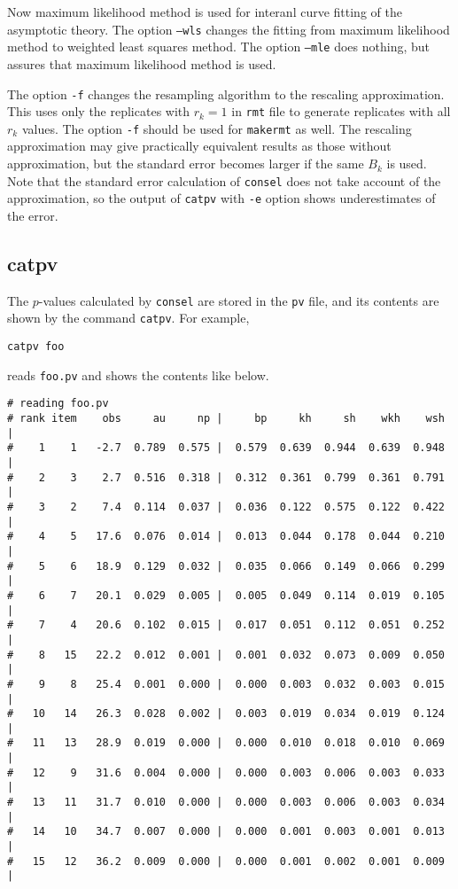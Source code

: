\documentclass[12pt]{article}
\begin{document}
Now maximum likelihood method is used for interanl curve fitting of the
asymptotic theory. The option {\tt --wls} changes the fitting from
maximum likelihood method to weighted least squares method.  The option
{\tt --mle} does nothing, but assures that maximum likelihood method is
used.

The option {\tt -f} changes the resampling algorithm to the rescaling
approximation. This uses only the replicates with $r_k=1$ in {\tt rmt}
file to generate replicates with all $r_k$ values. The option {\tt -f}
should be used for {\tt makermt} as well. The rescaling approximation
may give practically equivalent results as those without approximation,
but the standard error becomes larger if the same $B_k$ is used. Note
that the standard error calculation of {\tt consel} does not take account of
the approximation, so the output of {\tt catpv} with {\tt -e} option
shows underestimates of the error.



\subsection{catpv}

The $p$-values calculated by {\tt consel} are stored in the {\tt pv}
file, and its contents are shown by the command {\tt catpv}. For
example,
\begin{verbatim}
catpv foo
\end{verbatim}
reads {\tt foo.pv} and shows the contents like below.
{\small
\begin{verbatim}
# reading foo.pv
# rank item    obs     au     np |     bp     kh     sh    wkh    wsh |
#    1    1   -2.7  0.789  0.575 |  0.579  0.639  0.944  0.639  0.948 |
#    2    3    2.7  0.516  0.318 |  0.312  0.361  0.799  0.361  0.791 |
#    3    2    7.4  0.114  0.037 |  0.036  0.122  0.575  0.122  0.422 |
#    4    5   17.6  0.076  0.014 |  0.013  0.044  0.178  0.044  0.210 |
#    5    6   18.9  0.129  0.032 |  0.035  0.066  0.149  0.066  0.299 |
#    6    7   20.1  0.029  0.005 |  0.005  0.049  0.114  0.019  0.105 |
#    7    4   20.6  0.102  0.015 |  0.017  0.051  0.112  0.051  0.252 |
#    8   15   22.2  0.012  0.001 |  0.001  0.032  0.073  0.009  0.050 |
#    9    8   25.4  0.001  0.000 |  0.000  0.003  0.032  0.003  0.015 |
#   10   14   26.3  0.028  0.002 |  0.003  0.019  0.034  0.019  0.124 |
#   11   13   28.9  0.019  0.000 |  0.000  0.010  0.018  0.010  0.069 |
#   12    9   31.6  0.004  0.000 |  0.000  0.003  0.006  0.003  0.033 |
#   13   11   31.7  0.010  0.000 |  0.000  0.003  0.006  0.003  0.034 |
#   14   10   34.7  0.007  0.000 |  0.000  0.001  0.003  0.001  0.013 |
#   15   12   36.2  0.009  0.000 |  0.000  0.001  0.002  0.001  0.009 |
\end{verbatim}
}
\end{document}
